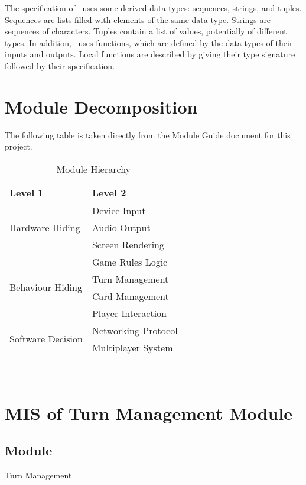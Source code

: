 \documentclass[12pt, titlepage]{article}
\begin{document}
\noindent
The specification of \progname \ uses some derived data types: sequences, strings, and
tuples. Sequences are lists filled with elements of the same data type. Strings
are sequences of characters. Tuples contain a list of values, potentially of
different types. In addition, \progname \ uses functions, which
are defined by the data types of their inputs and outputs. Local functions are
described by giving their type signature followed by their specification.

\section{Module Decomposition}

The following table is taken directly from the Module Guide document for this project.

\begin{table}[h!]
\centering
\begin{tabular}{p{} p{}}
\toprule
\textbf{Level 1} & \textbf{Level 2}\\
\midrule

\multirow{3}{0.3\textwidth}{Hardware-Hiding} & Device Input\\
& Audio Output\\
& Screen Rendering\\
\midrule

\multirow{4}{0.3\textwidth}{Behaviour-Hiding} & Game Rules Logic\\
& Turn Management\\
& Card Management\\
& Player Interaction\\
\midrule

\multirow{2}{0.3\textwidth}{Software Decision} 
& Networking Protocol\\
& Multiplayer System\\
\bottomrule

\end{tabular}
\caption{Module Hierarchy}
\label{TblMH}
\end{table}

\newpage
~\newpage



\section{MIS of Turn Management Module} 

\subsection{Module}
\hspace{1.5em}Turn Management
\end{document}
